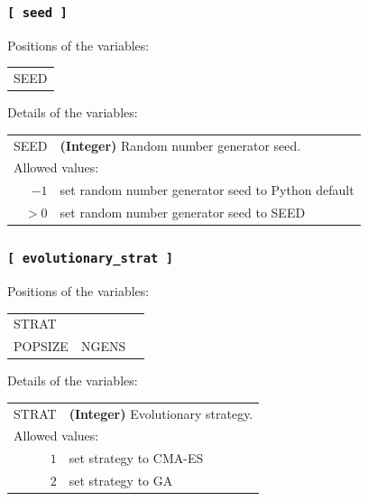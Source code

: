 \documentclass[10pt,a4paper,openany]{memoir}
\numberwithin{equation}{section}
\begin{document}
\subsubsection{\texttt{[~seed~]}}
\label{sec:inp-seed}

Positions of the variables:
\begin{center}
  \begin{tabular}{l}
    SEED
  \end{tabular}
\end{center}

\noindent Details of the variables:
\vspace{2ex}

{
\begin{tabular}{r@{ : }l}
\label{descr:seed}
      SEED&\textbf{(Integer)} Random number generator seed.                                                                        \\ 
\multicolumn{2}{l}{Allowed values:} \\ 
    \(-1\)&set random number generator seed to Python default                                                  \\ 
    \(>0\)&set random number generator seed to SEED                                                             \\ 
\end{tabular}
\vspace{1ex}
}

\subsubsection{\texttt{[~evolutionary\_strat~]}}
\label{sec:inp-ga}

Positions of the variables:
\begin{center}
  \begin{tabular}{lll}
    STRAT & \\
    POPSIZE & NGENS & \\
  \end{tabular}
\end{center}

\noindent Details of the variables:
\vspace{2ex}

{
\begin{tabular}{r@{ : }l}
   STRAT &\textbf{(Integer)} Evolutionary strategy.                                  \\ 
\multicolumn{2}{l}{Allowed values:} \\ 
  \(1\)& set strategy to CMA-ES                                    \\
  \(2\)& set strategy to GA                                    \\ 
\end{tabular}
\vspace{1ex}
}
\end{document}
